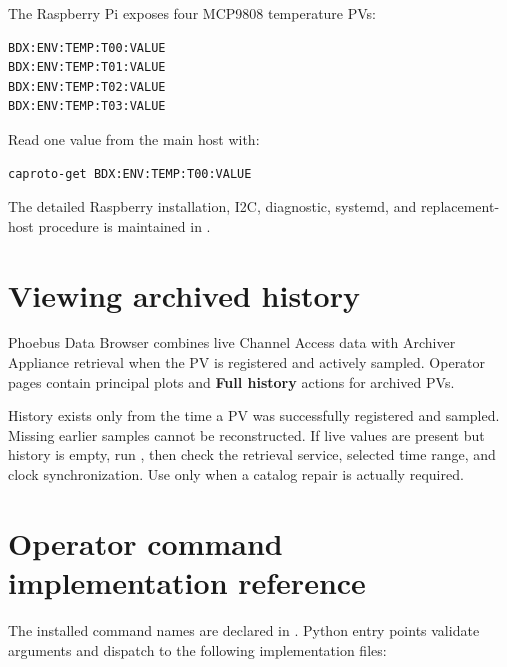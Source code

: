The Raspberry Pi exposes four MCP9808 temperature PVs:

\begin{lstlisting}[style=shell]
BDX:ENV:TEMP:T00:VALUE
BDX:ENV:TEMP:T01:VALUE
BDX:ENV:TEMP:T02:VALUE
BDX:ENV:TEMP:T03:VALUE
\end{lstlisting}

Read one value from the main host with:

\begin{lstlisting}[style=shell]
caproto-get BDX:ENV:TEMP:T00:VALUE
\end{lstlisting}

The detailed Raspberry installation, I2C, diagnostic, systemd, and replacement-host procedure is maintained in .

\section{Viewing archived history}

Phoebus Data Browser combines live Channel Access data with Archiver Appliance retrieval when the PV is registered and actively sampled. Operator pages contain principal plots and \textbf{Full history} actions for archived PVs.

History exists only from the time a PV was successfully registered and sampled. Missing earlier samples cannot be reconstructed. If live values are present but history is empty, run , then check the retrieval service, selected time range, and clock synchronization. Use  only when a catalog repair is actually required.

\section{Operator command implementation reference}

The installed command names are declared in . Python entry points validate arguments and dispatch to the following implementation files:

